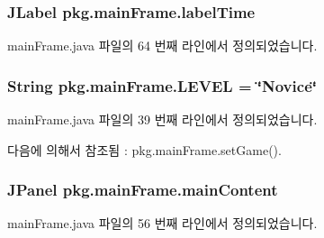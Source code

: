\subsubsection[{\texorpdfstring{label\+Time}{labelTime}}]{\setlength{\rightskip}{0pt plus 5cm}J\+Label pkg.\+main\+Frame.\+label\+Time\hspace{0.3cm}{\ttfamily [private]}}\hypertarget{classpkg_1_1main_frame_abd8e5f522ea7312634baf06ed61d5206}{}\label{classpkg_1_1main_frame_abd8e5f522ea7312634baf06ed61d5206}


main\+Frame.\+java 파일의 64 번째 라인에서 정의되었습니다.

\subsubsection[{\texorpdfstring{L\+E\+V\+EL}{LEVEL}}]{\setlength{\rightskip}{0pt plus 5cm}String pkg.\+main\+Frame.\+L\+E\+V\+EL = \char`\"{}Novice\char`\"{}\hspace{0.3cm}{\ttfamily [static]}}\hypertarget{classpkg_1_1main_frame_af08a1a3e5a422b15f9ebe173a386de24}{}\label{classpkg_1_1main_frame_af08a1a3e5a422b15f9ebe173a386de24}


main\+Frame.\+java 파일의 39 번째 라인에서 정의되었습니다.



다음에 의해서 참조됨 \+:  pkg.\+main\+Frame.\+set\+Game().

\subsubsection[{\texorpdfstring{main\+Content}{mainContent}}]{\setlength{\rightskip}{0pt plus 5cm}J\+Panel pkg.\+main\+Frame.\+main\+Content\hspace{0.3cm}{\ttfamily [private]}}\hypertarget{classpkg_1_1main_frame_ac52666e4454808a34bc19f554aba065b}{}\label{classpkg_1_1main_frame_ac52666e4454808a34bc19f554aba065b}


main\+Frame.\+java 파일의 56 번째 라인에서 정의되었습니다.

